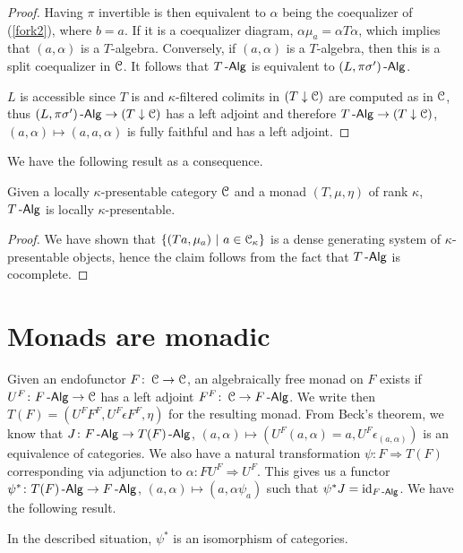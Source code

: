\documentclass[a4paper,11pt,oneside,openany]{scrbook}
\begin{document}
\begin{proof}
	Having $\pi$ invertible is then equivalent to $\alpha$ being the coequalizer
    of (\ref{fork2}), where $b=a$. If it is a coequalizer diagram,
    $\alpha\mu_a=\alpha T\alpha$, which implies that $(a,\alpha)$ is a
    $T$-algebra. Conversely, if $(a,\alpha)$ is a $T$-algebra, then this is a
    split coequalizer in $\operatorname{\mathcal{C}}$. It follows that $T\operatorname{-\mathsf{Alg}}$ is equivalent to
    $(L,\pi\sigma')\operatorname{-\mathsf{Alg}}$.

	$L$ is accessible since $T$ is and $\kappa$-filtered colimits in
    $(T\downarrow\operatorname{\mathcal{C}})$ are computed as in $\operatorname{\mathcal{C}}$, thus
    $(L,\pi\sigma')\operatorname{-\mathsf{Alg}}\rightarrow(T\downarrow\operatorname{\mathcal{C}})$ has a left adjoint and
    therefore $T\operatorname{-\mathsf{Alg}}\rightarrow (T\downarrow\operatorname{\mathcal{C}})$,
    $(a,\alpha)\mapsto(a,a,\alpha)$ is fully faithful and has a left adjoint.
\end{proof}

We have the following result as a consequence.

\begin{thm}
	Given a locally $\kappa$-presentable category $\operatorname{\mathcal{C}}$ and a monad
    $(T,\mu,\eta)$ of rank $\kappa$, $T\operatorname{-\mathsf{Alg}}$ is locally $\kappa$-presentable.
\end{thm}

\begin{proof}
	We have shown that $\{(Ta,\mu_a)\ |\ a\in\operatorname{\mathcal{C}}_\kappa\}$ is a dense generating
    system of $\kappa$-presentable objects, hence the claim follows from the
    fact that $T\operatorname{-\mathsf{Alg}}$ is cocomplete.
\end{proof}

\section{Monads are monadic}

Given an endofunctor $F\colon\operatorname{\mathcal{C}}\rightarrow\operatorname{\mathcal{C}}$, an algebraically free monad on
$F$ exists if $U^F\colon F\operatorname{-\mathsf{Alg}}\rightarrow\operatorname{\mathcal{C}}$ has a left adjoint
$F^F\colon\operatorname{\mathcal{C}}\rightarrow F\operatorname{-\mathsf{Alg}}$. We write then $T(F)=(U^FF^F,U^F\epsilon
F^F,\eta)$ for the resulting monad. From Beck's theorem, we know that $J\colon
F\operatorname{-\mathsf{Alg}}\rightarrow T(F)\operatorname{-\mathsf{Alg}}$, $(a,\alpha)\mapsto
(U^F(a,\alpha)=a,U^F\epsilon_{(a,\alpha)})$ is an equivalence of categories. We
also have a natural transformation $\psi\colon F\Rightarrow T(F)$ corresponding
via adjunction to $\alpha\colon FU^F\Rightarrow U^F$. This gives us a functor
$\psi^*\colon T(F)\operatorname{-\mathsf{Alg}}\rightarrow F\operatorname{-\mathsf{Alg}}$, $(a,\alpha)\mapsto (a,\alpha\psi_a)$
such that $\psi^* J=\operatorname{id}_{F\operatorname{-\mathsf{Alg}}}$. We have the following result.

\begin{prop}
	In the described situation, $\psi^*$ is an isomorphism of categories.
\end{prop}
\end{document}
